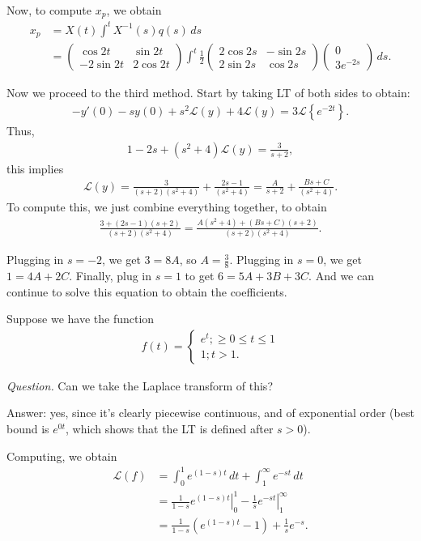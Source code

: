 \documentclass{article}
\newcommand{\mat}[1]{\begin{pmatrix}#1\end{pmatrix}}
\newcommand{\LL}{\mathcal{L}}
\begin{document}
Now, to compute $x_p$, we obtain
\begin{align*}
  x_p &= X(t) \int^{t} X^{-1}(s) q(s) \, ds \\
  &= \mat{\cos 2t & \sin 2t \\ - 2 \sin 2t & 2 \cos 2t} \int^{t} \frac{1}{2} \mat{2 \cos 2s & - \sin 2s \\ 2 \sin 2s & \cos 2s} \mat{0 \\ 3 e^{-2s}} \, ds.
\end{align*}

Now we proceed to the third method.  Start by taking LT of both sides to obtain:
\begin{align*}
  - y'(0) - s y(0) + s^2 \LL (y) + 4 \LL(y) = 3 \LL \left\{ e^{-2t} \right\}.
\end{align*}
Thus,
\begin{align*}
  1 - 2s + (s^2 + 4) \LL (y) = \frac{3}{s+2},
\end{align*}
this implies
\begin{align*}
  \LL(y) =\frac{3}{(s+2)(s^2+4)} + \frac{2s-1}{(s^2+4)} = \frac{A}{s+2} + \frac{Bs + C}{(s^2+4)}.
\end{align*}
To compute this, we just combine everything together, to obtain
\begin{align*}
  \frac{3 + (2s-1)(s+2)}{(s+2)(s^2+4)} = \frac{A(s^2+4) + (Bs+C)(s+2)}{(s+2)(s^2+4)}.
\end{align*}

Plugging in $s = -2$, we get $3 = 8A$, so $A = \frac{3}{8}$.  Plugging in $s = 0$, we get $1 = 4A + 2C$.  Finally, plug in $s=1$ to get $6 = 5A + 3B + 3C$.  And we can continue to solve this equation to obtain the coefficients.

Suppose we have the function
\begin{align*}
  f(t) = 
  \begin{cases}
    e^t; \geq 0 \leq t \leq 1 \\
    1; t > 1.
  \end{cases}
\end{align*}

{\it Question.} Can we take the Laplace transform of this?

Answer: yes, since it's clearly piecewise continuous, and of exponential order (best bound is $e^{0t}$, which shows that the LT is defined after $s > 0$).

Computing, we obtain
\begin{align*}
  \LL(f) &= \int_{0}^{1} e^{(1-s) t} \, dt + \int_{1}^{\infty} e^{-st} \, dt \\
  &= \frac{1}{1-s} \left . e^{(1-s)t } \right |_{0}^{1} - \frac{1}{s} \left . e^{-st} \right |_{1}^{\infty} \\
  &= \frac{1}{1-s} \left( e^{(1-s)t} - 1 \right) + \frac{1}{s} e^{-s}.
\end{align*}
\end{document}
